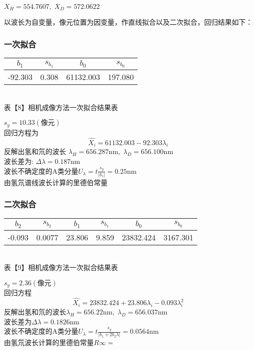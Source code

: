 \documentclass[8pt,a4paper,nocap]{ctexart}
\begin{document}
\(X_H = 554.7607,\;X_D = 572.0622\)

以波长为自变量，像元位置为因变量，作直线拟合以及二次拟合，回归结果如下：
\subsubsection{一次拟合}
\begin{center}
	\begin{tabular}{|c|c|c|c|}\hline
		\(b_1\) & \(s_{b_1}\) & \(b_0\) & \(s_{b_0}\)\\ \hline
		-92.303 & 0.308	& 61132.003 & 197.080 \\ \hline
	\end{tabular}\\
	{\footnotesize 表【8】相机成像方法一次拟合结果表}
\end{center}

\(s_y = 10.33(\text{像元})\)\\
回归方程为 \[\hat{X_i} = 61132.003 -92.303\lambda_i \]
反解出氢和氘的波长 \(\lambda_H = 656.287 \mathrm{nm} ,\; \lambda_D = 656.100\mathrm{nm}\)\\
波长差为: \(\Delta\lambda = 0.187 \mathrm{nm}\)\\
波长不确定度的A类分量\(\displaystyle U_\lambda = t\frac{s_y}{|b_1|} = 0.25 \mathrm{nm}\)\\
由氢氘谱线波长计算的里德伯常量

\subsubsection{二次拟合}
 \begin{center}
 	\begin{tabular}{|c|c|c|c|c|c|}\hline
 		\(b_2\) & \(s_{b_2}\) &	\(b_1\) & \(s_{b_1}\) & \(b_0\) & \(s_{b_0}\)\\ \hline
 		-0.093 & 0.0077 & 23.806 & 9.859 & 23832.424 & 3167.301 \\ \hline
 	\end{tabular}\\
 		{\footnotesize 表【9】相机成像方法一次拟合结果表}
 \end{center}
 
 \(s_y = 2.36 (\text{像元})\)\\
 回归方程\[\hat{X_i} = 23832.424 + 23.806\lambda_i -0.093\lambda_i^2\]
 反解出氢和氘的波长\(\lambda_H = 656.22 \mathrm{nm},\;\lambda_D = 656.037 \mathrm{nm}\)\\
 波长差为\(\Delta\lambda = 0.1826 \mathrm{nm}\)\\
 波长不确定度的A类分量\(\displaystyle U_\lambda = t\frac{s_y}{|b_1 + 2b_2\lambda|} = 0.0564 \mathrm{nm}\)\\
 由氢氘波长计算的里德伯常量\(R\infty = \)
 
\end{document}
